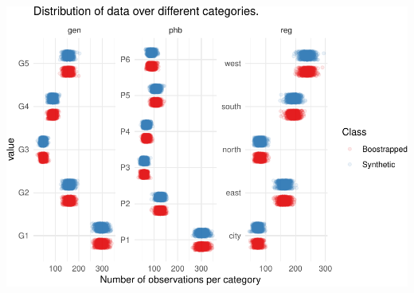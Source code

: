 \documentclass[psych,article,submit,moreauthors,pdftex]{mdpi}
\begin{document}
\includegraphics{Manuscript_files/figure-latex/univariate-statistics-II-1.pdf}
\end{document}
